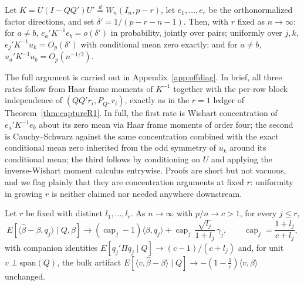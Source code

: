 \begin{lemma}\label{lem:offdiag}
Let $K=U(I-QQ')U'\stackrel{d}{=}W_n(I_n,p-r)$, let $e_1,\dots,e_r$ be the orthonormalized factor directions, and set $\delta'=1/(p-r-n-1)$. Then, with $r$ fixed as $n\to\infty$: for $a\ne b$, $e_a'K^{-1}e_b=o(\delta')$ in probability, jointly over pairs; uniformly over $j,k$, $e_j'K^{-1}u_k=O_p(\delta')$ with conditional mean zero exactly; and for $a\ne b$, $u_a'K^{-1}u_b=O_p(n^{-1/2})$.
\end{lemma}

The full argument is carried out in Appendix~\ref{app:offdiag}. In brief, all three rates follow from Haar frame moments of $K^{-1}$ together with the per-row block independence of $(QQ'r_i, P_{Q^\perp}r_i)$, exactly as in the $r=1$ ledger of Theorem~\ref{thm:captureR1}. In full, the first rate is Wishart concentration of $e_a'K^{-1}e_b$ about its zero mean via Haar frame moments of order four; the second is Cauchy--Schwarz against the same concentration combined with the exact conditional mean zero inherited from the odd symmetry of $u_k$ around its conditional mean; the third follows by conditioning on $U$ and applying the inverse-Wishart moment calculus entrywise. Proofs are short but not vacuous, and we flag plainly that they are concentration arguments at fixed $r$: uniformity in growing $r$ is neither claimed nor needed anywhere downstream.

\begin{theorem}\label{thm:captureFixedR}
Let $r$ be fixed with distinct $l_1,\dots,l_r$. As $n\to\infty$ with $p/n\to c>1$, for every $j\le r$,
\[
E[\langle\hat\beta-\beta,q_j\rangle\mid Q,\beta]
\to(\operatorname{cap}_j-1)\langle\beta,q_j\rangle
+\operatorname{cap}_j\,\frac{\sqrt{l_j}}{1+l_j}\,\gamma_j,
\qquad \operatorname{cap}_j=\frac{1+l_j}{c+l_j},
\]
with companion identities $E[q_j'\Pi q_j\mid Q]\to(c-1)/(c+l_j)$ and, for unit $v\perp\mathrm{span}(Q)$, the bulk artifact $E[\langle v,\hat\beta-\beta\rangle\mid Q]\to-(1-\tfrac1c)\langle v,\beta\rangle$ unchanged.
\end{theorem}

